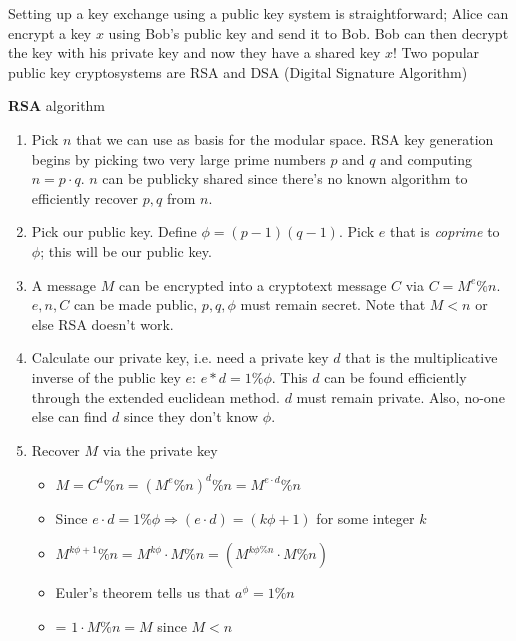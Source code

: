 \documentclass[../notes.tex]{subfiles}
\begin{document}
Setting up a key exchange using a public key system is straightforward; Alice can encrypt a key $ x $ using Bob's public key and send it to Bob. Bob can then decrypt the key with his private key and now they have a shared key $ x $!
Two popular public key cryptosystems are RSA and DSA (Digital Signature Algorithm)



\begin{definition}
    \textbf{RSA} algorithm

    \begin{enumerate}
        \item Pick $ n $ that we can use as basis for the modular space. RSA key generation begins by picking two very large prime numbers $ p $ and $ q $ and computing $ n = p \cdot  q $. $ n $ can be publicky shared since there's no known algorithm to efficiently recover $ p, q $ from $ n $. 
        \item Pick our public key. Define $ \phi = (p-1)(q-1) $. Pick $ e $ that is \textit{coprime} to $ \phi $; this will be our public key.
        \item  A message $M$ can be encrypted into a cryptotext message $ C $ via $ C = M^e \% n $. $ e, n, C$ can be made public, $ p, q, \phi $ must remain secret. Note that $ M < n $ or else RSA doesn't work.
        \item Calculate our private key, i.e. need a private key $ d $ that is the multiplicative inverse of the public key $ e $: $ e*d = 1 \% \phi $. This $ d $ can be found efficiently through the extended euclidean method. $ d $ must remain private. Also, no-one else can find $ d $ since they don't know $ \phi $.
        \item Recover $ M $ via the private key
            \begin{itemize}
                \item $ M = C^d \% n = (M^e \% n)^d \% n = M^{e \cdot d} \% n $
                \item Since $ e \cdot  d = 1 \% \phi  \Rightarrow (e \cdot  d) = (k \phi + 1) $ for some integer $ k $
                \item $ M^{k \phi + 1} \% n = M^{k \phi} \cdot M \% n = (M^{k\phi \% n } \cdot M \% n) $
                \item Euler's theorem tells us that $ a^{\phi} = 1 \% n $
                \item = $ 1 \cdot M \% n = M $ since $ M < n $
            \end{itemize}
    \end{enumerate}
\end{definition}
\end{document}

